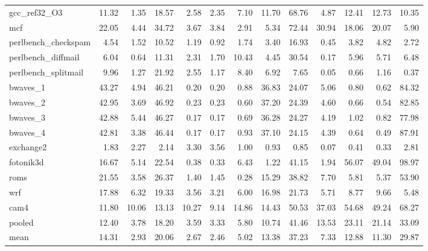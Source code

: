 \documentclass[10pt,a4paper]{article}
\begin{document}
{\begin{longtable}{@{}lrrrrrrrrrrrr@{}}
gcc\_ref32\_O3 & 11.32 & 1.35 & 18.57 & 2.58 & 2.35 & 7.10 & 11.70 & 68.76 & 4.87 & 12.41 & 12.73 & 10.35 \\
mcf & 22.05 & 4.44 & 34.72 & 3.67 & 3.84 & 2.91 & 5.34 & 72.44 & 30.94 & 18.06 & 20.07 & 5.90 \\
perlbench\_checkspam & 4.54 & 1.52 & 10.52 & 1.19 & 0.92 & 1.74 & 3.40 & 16.93 & 0.45 & 3.82 & 4.82 & 2.72 \\
perlbench\_diffmail & 6.04 & 0.64 & 11.31 & 2.31 & 1.70 & 10.43 & 4.45 & 30.54 & 0.17 & 5.96 & 5.71 & 6.48 \\
perlbench\_splitmail & 9.96 & 1.27 & 21.92 & 2.55 & 1.17 & 8.40 & 6.92 & 7.65 & 0.05 & 0.66 & 1.16 & 0.37 \\
bwaves\_1 & 43.27 & 4.94 & 46.21 & 0.20 & 0.20 & 0.88 & 36.83 & 24.07 & 5.06 & 0.80 & 0.62 & 84.32 \\
bwaves\_2 & 42.95 & 3.69 & 46.92 & 0.23 & 0.23 & 0.60 & 37.20 & 24.39 & 4.60 & 0.66 & 0.54 & 82.85 \\
bwaves\_3 & 42.88 & 5.44 & 46.27 & 0.17 & 0.17 & 0.69 & 36.28 & 24.27 & 4.19 & 1.02 & 0.82 & 77.98 \\
bwaves\_4 & 42.81 & 3.38 & 46.44 & 0.17 & 0.17 & 0.93 & 37.10 & 24.15 & 4.39 & 0.64 & 0.49 & 87.91 \\
exchange2 & 1.83 & 2.27 & 2.14 & 3.30 & 3.56 & 1.00 & 0.93 & 0.85 & 0.07 & 0.41 & 0.33 & 2.81 \\
fotonik3d & 16.67 & 5.14 & 22.54 & 0.38 & 0.33 & 6.43 & 1.22 & 41.15 & 1.94 & 56.07 & 49.04 & 98.97 \\
roms & 21.55 & 3.58 & 26.37 & 1.40 & 1.45 & 0.28 & 15.29 & 38.82 & 7.70 & 5.81 & 5.37 & 53.90 \\
wrf & 17.88 & 6.32 & 19.33 & 3.56 & 3.21 & 6.00 & 16.98 & 21.73 & 5.71 & 8.77 & 9.66 & 5.48 \\
cam4 & 11.80 & 10.06 & 13.13 & 10.27 & 9.14 & 14.86 & 14.43 & 50.53 & 37.03 & 54.68 & 49.24 & 68.27 \\
\midrule
pooled & 12.40 & 3.78 & 18.20 & 3.59 & 3.33 & 5.80 & 10.74 & 41.46 & 13.53 & 23.11 & 21.14 & 33.09 \\
mean & 14.31 & 2.93 & 20.06 & 2.67 & 2.46 & 5.02 & 13.38 & 37.23 & 7.33 & 12.88 & 11.30 & 29.87 \\
\end{longtable}
}
\end{document}
